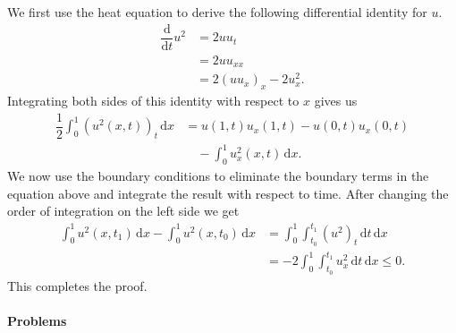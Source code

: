 \begin{Proof}
We first use the heat equation to derive the following differential identity for $u$.
\begin{equation}\label{eq:heat-pointwise-energy-identity}
\begin{aligned}
\dfrac{\mathrm{d}}{\mathrm{d}t}u^2&=2uu_t\\
&=2uu_{xx}\\
&=2(uu_x)_x-2u_x^2.
\end{aligned}
\end{equation}
Integrating both sides of this identity with respect to $x$ gives us
\begin{equation}\label{eq:heat-integrated-energy-identity}
\begin{aligned}
\dfrac12\int_0^1(u^2(x,t))_t\,\mathrm{d}x
&=u(1,t)u_x(1,t)-u(0,t)u_x(0,t)\\
&\quad-\int_0^1u_x^2(x,t)\,\mathrm{d}x.
\end{aligned}
\end{equation}
We now use the boundary conditions to eliminate the boundary terms in the equation above and integrate the result with respect to time. After changing the order of integration on the left side we get
\begin{equation}\label{eq:heat-energy-dissipation}
\begin{aligned}
\int_0^1u^2(x,t_1)\,\mathrm{d}x-\int_0^1u^2(x,t_0)\,\mathrm{d}x
&=\int_0^1\int_{t_0}^{t_1}(u^2)_t\,\mathrm{d}t\,\mathrm{d}x\\
&=-2\int_0^1\int_{t_0}^{t_1}u_x^2\,\mathrm{d}t\,\mathrm{d}x\leq0.
\end{aligned}
\end{equation}
This completes the proof.
\end{Proof}

\paragraph*{Problems}

